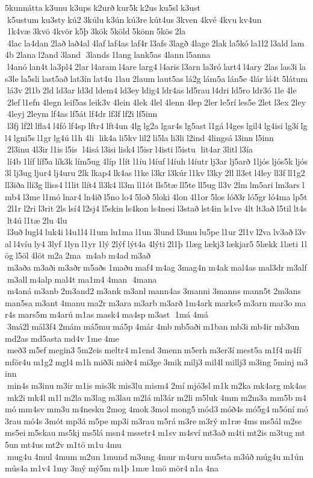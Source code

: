 5kunnátta k3unu k3ups k2urð kur5k k2us ku5sl k3ust  k5ustum ku3sty kú2 3kúlu k3ún kú3re kút4us 3kven 4kvé 4kvu kv4un  1k4væ 3kvö 4kvör k5þ 3kök 5köld 5könn 5kös 2la  4lac la4dan 2lað lað4al 4laf laf4as laf4r l3afs 3lagð 4lage 2lak la5kó la1l2 l3ald lam4b 2lana l2and 3land  3lands 1lang lank5as 4lann l5anna  l4anó lan4t la3pl4 2lar l4aram l4are larg4 l4aris l3arn la3ró lart4 l4ary 2las las3i las3le la5sli last5að lat3ín lat4u 1lau 2laum laut5as lá2g lám5a lán5e 4lár lá4t 5látum lá3v 2l1b 2ld ld3ar ld3d ldem4 ld3ey ldig4 ldr4as ld5rau l4dri ld5ro ldr3ó 1le 4le  2lef l1efn 4legn leif5as leik3v 4lein 4lek 4lel 4lenn 4lep 2ler le5rí les5e 2let l3ex 2ley  4leyj 2leym lf4as lf5át lf4dr lf3f lf2i lf5inn  l3fj lf2l lfla4 l4fó lf4sp lftr4 lft4un 4lg lg2a lgar4s lg5ast l1gá l4ges lgil4 lg4isi lg3í lgl4 lgni5s l1gr lg4ú l1h 4li  lik4a li5kv lil2 li5la li3li l2ind 4lingsá l3inn l5inn  2l3inu 4l3ir l1is l5is  l4isá l3isi lisk4 l5isr l4isti l5istu  lit4ar 3litl l3ía  lí4b 1líf líf5a lík3k lím5ug 4líp 1lít l1íu l4íuf l4íuh l4íutr lj3ar lj5arð 1ljós ljós5k ljós3l lj3ug ljur4 lj4uru 2lk lkap4 lk4as l1ke l3kr l3kúr l1kv l3ky 2ll ll3et l4ley ll3f ll1g2 ll3iða lli3g lliss4 l1lit llít4 ll3k4 ll3m ll1ót lls5tæ ll5te ll5ug ll3v 2lm lm5ari lm3ars lmb4 l3me l1mó lnar4 ln4ið l5no lo4 5loð 5loki 4lon 4l1or 5los lóð3r ló5gr ló4ma lp5t 2l1r l2ri l3rit 2ls lsí4 l2sj4 l5skin ls4kon ls4nesi l3stað lst4in ls1ve 4lt lt3að l5til lt4s lt4ú l1tæ 2lu 4lu  l3uð lugl4 luk4i l4u1l4 l1um lu1ma l1un 3lund l3unu lu5pe l1ur 2l1v l2va lv3að l3val l4víu ly4 3lyf 1lyn l1yr 1lý 2lýf lýt4a 4lýti 2l1þ 1læg lækj3 lækjar5 5lækk 1læti 1lög l5öl 4löt m2a 2ma  m4ab m4ad m3að  m3aða m3aði m3aðr m5aðs 1maðu maf4 m4ag 3mag4n m4ak mal4as mal3dr m3alf m3all m4alp mal4t ma1m4 4man  4mana  m4aná m3anb 2m3and2 m3ank m3anl mann4as 3manni 3manns mann5t 2m3ans man5sa m3ant 4manu ma2r m3ara m3arb m3arð 1m4ark marks5 m3arn mar3o mar4s mars5m m4arú m1as mask4 ma4sp m3ast  1má 4má  3má2l mál3f4 2mám má5mu má5p 4már 4mb mb5aði m1ban mb3i mb4ir mb3un md2as md5asta md4v 1me 4me  með3 m5ef megin3 5m2eis meltr4 m1end 3menn m5erh m3er3í mest5a m1f4 m4fí mför4u m1g2 mgl4 m1h mið3i miðr4 mi3ge 3mik milj3 mil4l millj3 m3ing 5minj m3inn  min4s m3inu m3ir m1is mis3k mis3lu mism4 2mí mjó3sl m1k m2ka mk4arg mk4as mk2i mk4l m1l m2la m3lag m3lau m2lá ml3ár m2li m5luk 4mm m2m3a mm5b m4mó mm4sv mm3u m4nesku 2mog 4mok 3mol mong5 mód3 móð4s mó5g4 m5óní mó3rau mó4s 3mót mp3á m5pe mp3i m3rau m5rá m3re m3rý m1ræ 4ms ms5ál m2se ms5ei m5skau ms5kj ms5lá msn4 mssetr4 m1sv m4sví mt3að m4ti mt2is m3tug mt5un mt4us mt2v m1tö m1u 4mu  mug4u 4mul 4mum m2un 1mund m3ung 4mur m4uru mu5sta m3úð múg4u m1ún mús4a m1v4 1my 3mý mý5m m1þ 1mæ 1mö mör4 n1a 4na 